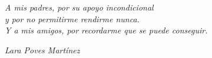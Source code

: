 \cleardoublepage


\

\ %

\

\

\ %

\

\

\

\

\

\

\

\

\

\

\

\



\begin{flushright}
    \vspace{\fill} %
    \emph{A mis padres, por su apoyo incondicional\\
    y por no permitirme rendirme nunca.\\[0.5cm]
    Y a mis amigos, por recordarme que se puede conseguir.}
    \par
    \vspace{0.5cm}
    \emph{Lara Poves Martínez}
\end{flushright}

\thispagestyle{empty}


